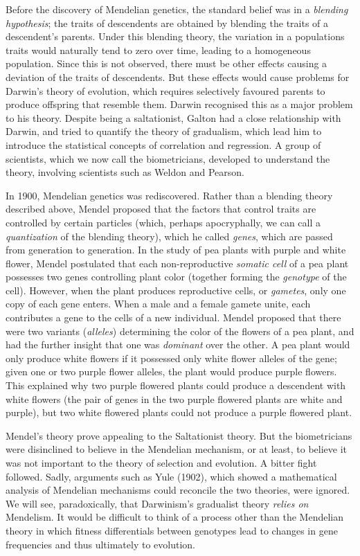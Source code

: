 Before the discovery of Mendelian genetics, the standard belief was in a \emph{blending hypothesis}; the traits of descendents are obtained by blending the traits of a descendent's parents. Under this blending theory, the variation in a populations traits would naturally tend to zero over time, leading to a homogeneous population. Since this is not observed, there must be other effects causing a deviation of the traits of descendents. But these effects would cause problems for Darwin's theory of evolution, which requires selectively favoured parents to produce offspring that resemble them. Darwin recognised this as a major problem to his theory. Despite being a saltationist, Galton had a close relationship with Darwin, and tried to quantify the theory of gradualism, which lead him to introduce the statistical concepts of correlation and regression. A group of scientists, which we now call the biometricians, developed to understand the theory, involving scientists such as Weldon and Pearson.

In 1900, Mendelian genetics was rediscovered. Rather than a blending theory described above, Mendel proposed that the factors that control traits are controlled by certain particles (which, perhaps apocryphally, we can call a \emph{quantization} of the blending theory), which he called \emph{genes}, which are passed from generation to generation. In the study of pea plants with purple and white flower, Mendel postulated that each non-reproductive \emph{somatic cell} of a pea plant possesses two genes controlling plant color (together forming the \emph{genotype} of the cell). However, when the plant produces reproductive cells, or \emph{gametes}, only one copy of each gene enters. When a male and a female gamete unite, each contributes a gene to the cells of a new individual. Mendel proposed that there were two variants (\emph{alleles}) determining the color of the flowers of a pea plant, and had the further insight that one was \emph{dominant} over the other. A pea plant would only produce white flowers if it possessed only white flower alleles of the gene; given one or two purple flower alleles, the plant would produce purple flowers. This explained why two purple flowered plants could produce a descendent with white flowers (the pair of genes in the two purple flowered plants are white and purple), but two white flowered plants could not produce a purple flowered plant.

Mendel's theory prove appealing to the Saltationist theory. But the biometricians were disinclined to believe in the Mendelian mechanism, or at least, to believe it was not important to the theory of selection and evolution. A bitter fight followed. Sadly, arguments such as Yule (1902), which showed a mathematical analysis of Mendelian mechanisms could reconcile the two theories, were ignored. We will see, paradoxically, that Darwinism's gradualist theory \emph{relies on} Mendelism. It would be difficult to think of a process other than the Mendelian theory in which fitness differentials between genotypes lead to changes in gene frequencies and thus ultimately to evolution.

